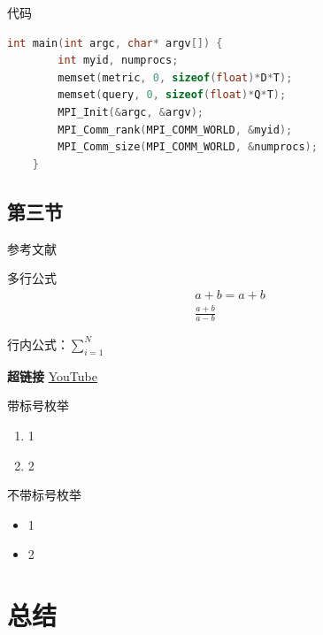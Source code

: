 \documentclass[UTF8,a4paper,10pt]{ctexart}
\newcommand{\xiaosi}{\fontsize{12pt}{18pt}\selectfont}            %
\begin{document}
代码
\begin{lstlisting}[title=逐列访问平凡算法,frame=trbl,language={C++}]
    int main(int argc, char* argv[]) {
    	int myid, numprocs;
        memset(metric, 0, sizeof(float)*D*T);
        memset(query, 0, sizeof(float)*Q*T);
    	MPI_Init(&argc, &argv);
    	MPI_Comm_rank(MPI_COMM_WORLD, &myid);
    	MPI_Comm_size(MPI_COMM_WORLD, &numprocs);
    }
\end{lstlisting}


\subsection{第三节}

参考文献\cite{adams1995hitchhiker}\cite{shin2016deep}
    
多行公式
\begin{align}
  a+b = a + b \\
  \frac{a+b}{a-b}
\end{align}

行内公式：$\sum^N_{i=1}$

\textbf{超链接}  \href{http://youtube.com/}{YouTube}

带标号枚举
\begin{enumerate}
  \item 1
  \item 2
\end{enumerate}

不带标号枚举
\begin{itemize}
  \item 1
  \item 2
\end{itemize}

\xiaosi{切换字体大小}

\section{总结}

\newpage

 
\end{document}

